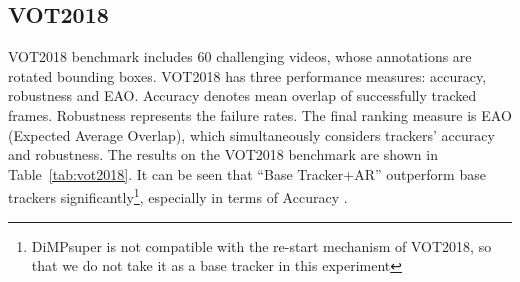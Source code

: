 \documentclass[final]{cvpr}
\begin{document}
{\begin{appendices}
\subsection{VOT2018}

VOT2018 benchmark includes $60$ challenging videos, whose annotations are rotated bounding boxes. VOT2018 has three performance measures: accuracy, robustness and EAO. 
Accuracy denotes mean overlap of successfully tracked frames. Robustness represents the failure rates. The final ranking measure is EAO (Expected Average Overlap), which simultaneously considers 
trackers' accuracy and robustness. The results on the VOT2018 benchmark are shown in Table~\ref{tab:vot2018}. It can be seen that ``Base Tracker+AR'' outperform base trackers significantly\footnote{DiMPsuper is not compatible with the re-start mechanism of VOT2018, so that we do not take it as a base tracker in this experiment}, especially in terms of Accuracy . 

\begin{table}[!ht]
    \centering
    \caption{Comparison on the VOT2018 benchmark. 
    The best three results are marked in \textbf{\textcolor[rgb]{1,0,0}{red}}, \textbf{\textcolor[rgb]{0,1,0}{green}} and \textbf{\textcolor[rgb]{0,0,1}{blue}} bold fonts respectively.}
    \label{tab:vot2018}
    \vspace{-3mm}
\end{table}



\end{appendices}}
\end{document}
